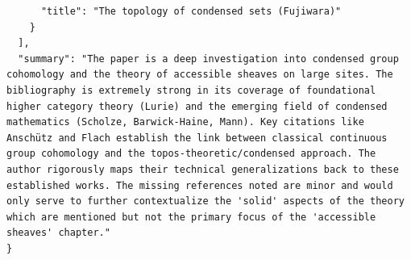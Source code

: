 \documentclass[11pt]{article}
\begin{document}
\begin{verbatim}
      "title": "The topology of condensed sets (Fujiwara)"
    }
  ],
  "summary": "The paper is a deep investigation into condensed group cohomology and the theory of accessible sheaves on large sites. The bibliography is extremely strong in its coverage of foundational higher category theory (Lurie) and the emerging field of condensed mathematics (Scholze, Barwick-Haine, Mann). Key citations like Anschütz and Flach establish the link between classical continuous group cohomology and the topos-theoretic/condensed approach. The author rigorously maps their technical generalizations back to these established works. The missing references noted are minor and would only serve to further contextualize the 'solid' aspects of the theory which are mentioned but not the primary focus of the 'accessible sheaves' chapter."
}
\end{verbatim}
\end{document}
